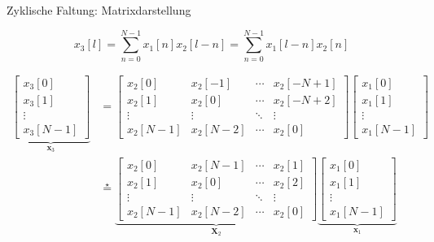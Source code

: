 \documentclass[14pt, aspectratio=169, handout]{beamer}
\begin{document}
\begin{frame}{Zyklische Faltung: Matrixdarstellung}
\vspace*{-0.5cm}
\small{
    $$x_3[l] = \sum_{n=0}^{N-1} x_1[n]x_2[l-n] = \sum_{n=0}^{N-1} x_1[l-n] x_2[n]$$

\begin{align*}
    \underbrace{\begin{bmatrix}
        x_3[0] \\
        x_3[1] \\
        \vdots \\
        x_3[N-1]
    \end{bmatrix}}_{\mathbf{x}_3} &= \begin{bmatrix}
        x_2[0] & x_2[-1] & \cdots & x_2[-N+1] \\
        x_2[1] & x_2[0] & \cdots & x_2[-N+2] \\
        \vdots & \vdots & \ddots & \vdots \\
        x_2[N-1] & x_2[N-2] & \cdots & x_2[0]
    \end{bmatrix} \begin{bmatrix}
        x_1[0] \\
        x_1[1] \\
        \vdots \\
        x_1[N-1]
    \end{bmatrix} \\
    &\overset{\star}{=} \underbrace{\begin{bmatrix}
        x_2[0] & x_2[N-1] & \cdots & x_2[1] \\
        x_2[1] & x_2[0] & \cdots & x_2[2] \\
        \vdots & \vdots & \ddots & \vdots \\
        x_2[N-1] & x_2[N-2] & \cdots & x_2[0]
    \end{bmatrix}}_{\mathbf{X}_2} \underbrace{\begin{bmatrix}
        x_1[0] \\
        x_1[1] \\
        \vdots \\
        x_1[N-1]
    \end{bmatrix}}_{\mathbf{x}_1}
\end{align*}}
\end{frame}
\end{document}
